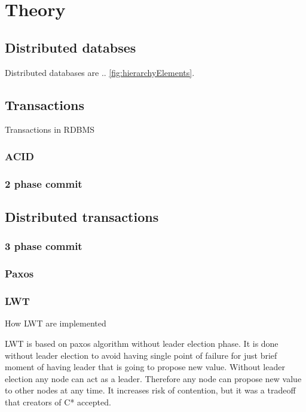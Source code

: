 \chapter{Theory}\label{chapter:theory}

\section{Distributed databses}\label{sec:theory:distDbs}
Distributed databases are .. \ref{fig:hierarchyElements}. \cite{CassandraDataStaxDocs} \cite{chandra2007PaxosMadeLive} \cite{lamport1982byzantine}

\section{Transactions}\label{sec:theory:transactions}
Transactions in RDBMS

\subsection{ACID}

\subsection{2 phase commit}

\section{Distributed transactions}

\subsection{3 phase commit}

\subsection{Paxos}

\subsection{LWT}

 How LWT are implemented


LWT is based on paxos algorithm without leader election phase. It is done without leader election to avoid having single point of failure for just brief moment of having leader that is going to propose new value. Without leader election any node can act as a leader. Therefore any node can propose new value to other nodes at any time. It increases risk of contention, but it was a tradeoff that creators of C* accepted. 


